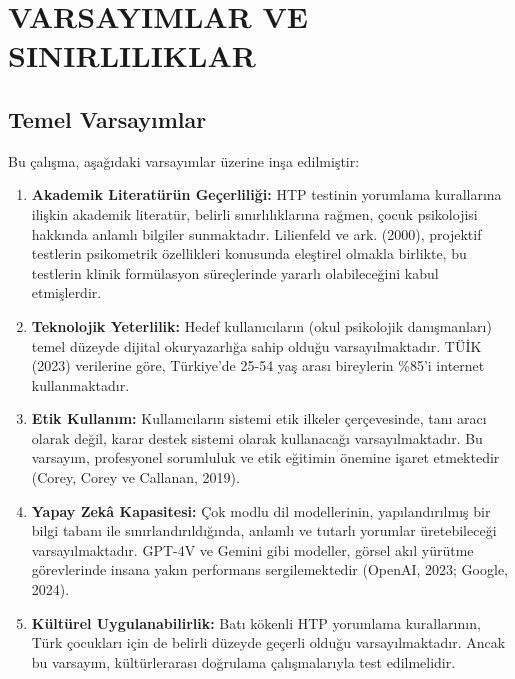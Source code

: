 
\chapter{VARSAYIMLAR VE SINIRLILIKLAR}

\section{Temel Varsayımlar}

Bu çalışma, aşağıdaki varsayımlar üzerine inşa edilmiştir:

\begin{enumerate}
  \item \textbf{Akademik Literatürün Geçerliliği:} HTP testinin yorumlama kurallarına ilişkin akademik literatür, belirli sınırlılıklarına rağmen, çocuk psikolojisi hakkında anlamlı bilgiler sunmaktadır. Lilienfeld ve ark. (2000), projektif testlerin psikometrik özellikleri konusunda eleştirel olmakla birlikte, bu testlerin klinik formülasyon süreçlerinde yararlı olabileceğini kabul etmişlerdir.

  \item \textbf{Teknolojik Yeterlilik:} Hedef kullanıcıların (okul psikolojik danışmanları) temel düzeyde dijital okuryazarlığa sahip olduğu varsayılmaktadır. TÜİK (2023) verilerine göre, Türkiye'de 25-54 yaş arası bireylerin \%85'i internet kullanmaktadır.

  \item \textbf{Etik Kullanım:} Kullanıcıların sistemi etik ilkeler çerçevesinde, tanı aracı olarak değil, karar destek sistemi olarak kullanacağı varsayılmaktadır. Bu varsayım, profesyonel sorumluluk ve etik eğitimin önemine işaret etmektedir (Corey, Corey ve Callanan, 2019).

  \item \textbf{Yapay Zekâ Kapasitesi:} Çok modlu dil modellerinin, yapılandırılmış bir bilgi tabanı ile sınırlandırıldığında, anlamlı ve tutarlı yorumlar üretebileceği varsayılmaktadır. GPT-4V ve Gemini gibi modeller, görsel akıl yürütme görevlerinde insana yakın performans sergilemektedir (OpenAI, 2023; Google, 2024).

  \item \textbf{Kültürel Uygulanabilirlik:} Batı kökenli HTP yorumlama kurallarının, Türk çocukları için de belirli düzeyde geçerli olduğu varsayılmaktadır. Ancak bu varsayım, kültürlerarası doğrulama çalışmalarıyla test edilmelidir.
\end{enumerate}

